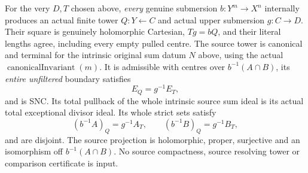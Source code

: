 \begin{theorem}
\label{hir:original-canonical-sum-same-separator-smooth-square}
\leanok
For the very $D,T$ chosen above, \emph{every} genuine submersion
$b:Y^m\to X^n$ internally produces an actual finite tower $Q:Y\leftarrow C$
and actual upper submersion $g:C\to D$. Their square is genuinely
holomorphic Cartesian, $Tg=bQ$, and their literal lengths agree,
including every empty pulled centre. The source tower is canonical and
terminal for the intrinsic original sum datum $N$ above, using the
actual $\operatorname{canonicalInvariant}(m)$. It is admissible with
centres over $b^{-1}(A\cap B)$, its \emph{entire unfiltered} boundary
satisfies
\[
 E_Q=g^{-1}E_T,
\]
and is SNC. Its total pullback of the whole intrinsic source sum ideal
is its actual total exceptional divisor ideal. Its whole strict sets
satisfy
\[
 (b^{-1}A)_Q=g^{-1}A_T,\qquad (b^{-1}B)_Q=g^{-1}B_T,
\]
and are disjoint. The source projection is holomorphic, proper,
surjective and an isomorphism off $b^{-1}(A\cap B)$. No source
compactness, source resolving tower or comparison certificate is input.
\end{theorem}
